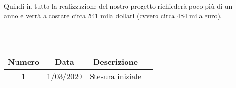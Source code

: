 \noindent Quindi in tutto la realizzazione del nostro progetto richiederà poco più di un anno e verrà a costare circa 541 mila dollari (ovvero circa 484 mila euro).

\begin{table}[b]
 \\ \\
\begin{tabular}{|c | c | c | c|} 
 	\hline
	 Numero & Data & Descrizione \\ [0.5ex] 
	\hline\hline
	1 & 1/03/2020 & Stesura iniziale \\
	\hline
\end{tabular}
\end{table}